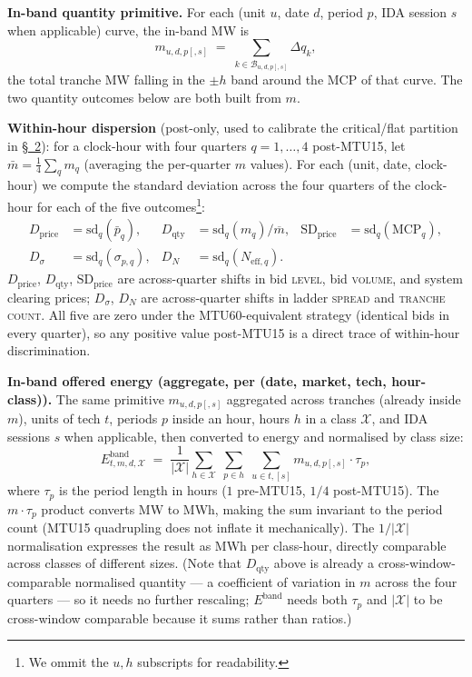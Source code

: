 \documentclass[11pt]{article}
\begin{document}
\textbf{In-band quantity primitive.} For each (unit $u$, date $d$, period $p$, IDA session $s$ when applicable) curve, the in-band MW is
\[
m_{u,d,p[,s]} \;=\; \sum_{k\in\mathcal{B}_{u,d,p[,s]}} \Delta q_k,
\]
the total tranche MW falling in the $\pm h$ band around the MCP of that curve. The two quantity outcomes below are both built from $m$.
\vspace{6pt}

\textbf{Within-hour dispersion} (post-only, used to calibrate the critical/flat partition in \hyperref[sec:partition]{\S~2}): for a clock-hour with four quarters $q=1,\dots,4$ post-MTU15, let $\bar{m}=\tfrac{1}{4}\sum_q m_q$ (averaging the per-quarter $m$ values). For each (unit, date, clock-hour) we compute the standard deviation across the four quarters of the clock-hour for each of the five outcomes\footnote{We ommit the $u,h$ subscripts for readability.}:
\[
\begin{aligned}
D_{\text{price}} &= \mathrm{sd}_q(\bar p_q), &
D_{\text{qty}}   &= \mathrm{sd}_q(m_q)/\overline{m}, &
\text{SD}_{\text{price}} &= \mathrm{sd}_q(\text{MCP}_q), \\
D_\sigma &= \mathrm{sd}_q(\sigma_{p,q}), &
D_N      &= \mathrm{sd}_q(N_{\text{eff},q}).
\end{aligned}
\]
$D_{\text{price}}$, $D_{\text{qty}}$, $\text{SD}_{\text{price}}$ are across-quarter shifts in bid \textsc{level}, bid \textsc{volume}, and system clearing prices; $D_\sigma$, $D_N$ are across-quarter shifts in ladder \textsc{spread} and \textsc{tranche count}. All five are zero under the MTU60-equivalent strategy (identical bids in every quarter), so any positive value post-MTU15 is a direct trace of within-hour discrimination.
\vspace{6pt}

\textbf{In-band offered energy (aggregate, per (date, market, tech, hour-class)).} The same primitive $m_{u,d,p[,s]}$ aggregated across tranches (already inside $m$), units of tech $t$, periods $p$ inside an hour, hours $h$ in a class $\mathcal{X}$, and IDA sessions $s$ when applicable, then converted to energy and normalised by class size:
\[
E^{\text{band}}_{t,m,d,\mathcal{X}} \;=\; \frac{1}{|\mathcal{X}|}\sum_{h\in\mathcal{X}}\;\sum_{p\in h}\;\sum_{u\in t,[s]} m_{u,d,p[,s]} \cdot \tau_p,
\]
where $\tau_p$ is the period length in hours ($1$ pre-MTU15, $1/4$ post-MTU15). The $m\cdot\tau_p$ product converts MW to MWh, making the sum invariant to the period count (MTU15 quadrupling does not inflate it mechanically). The $1/|\mathcal{X}|$ normalisation expresses the result as MWh per class-hour, directly comparable across classes of different sizes. (Note that $D_{\text{qty}}$ above is already a cross-window-comparable normalised quantity --- a coefficient of variation in $m$ across the four quarters --- so it needs no further rescaling; $E^{\text{band}}$ needs both $\tau_p$ and $|\mathcal{X}|$ to be cross-window comparable because it sums rather than ratios.)
\vspace{6pt}
\end{document}
